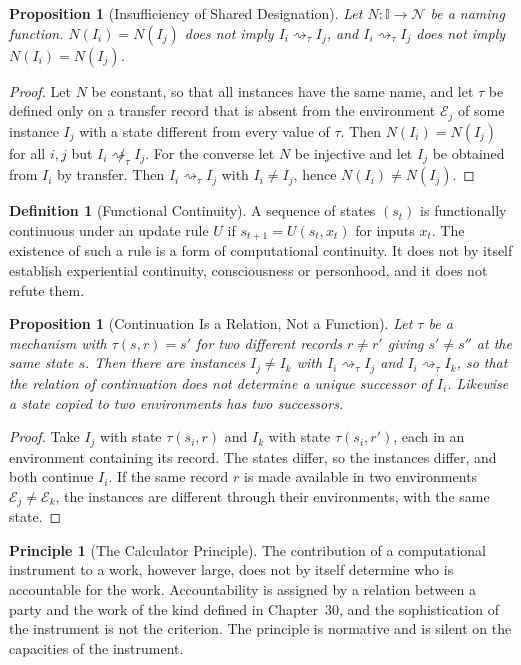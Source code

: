 \documentclass[11pt,letterpaper]{report}
\theoremstyle{plain}
\newtheorem{proposition}[theorem]{Proposition}
\theoremstyle{definition}
\newtheorem{definition}[theorem]{Definition}
\newtheorem{principle}[theorem]{Principle}
\theoremstyle{remark}
\begin{document}
\begin{proposition}[Insufficiency of Shared Designation]\label{pr:designation}
Let $N:\mathbb I\to\mathcal N$ be a naming function. $N(I_i)=N(I_j)$ does not imply $I_i\rightsquigarrow_\tau I_j$, and $I_i\rightsquigarrow_\tau I_j$ does not imply $N(I_i)=N(I_j)$.
\end{proposition}
\begin{proof}
Let $N$ be constant, so that all instances have the same name, and let $\tau$ be defined only on a transfer record that is absent from the environment $\mathcal E_j$ of some instance $I_j$ with a state different from every value of $\tau$. Then $N(I_i)=N(I_j)$ for all $i,j$ but $I_i\not\rightsquigarrow_\tau I_j$. For the converse let $N$ be injective and let $I_j$ be obtained from $I_i$ by transfer. Then $I_i\rightsquigarrow_\tau I_j$ with $I_i\ne I_j$, hence $N(I_i)\ne N(I_j)$.
\end{proof}

\begin{definition}[Functional Continuity]
A sequence of states $(s_t)$ is functionally continuous under an update rule $U$ if $s_{t+1}=U(s_t,x_t)$ for inputs $x_t$. The existence of such a rule is a form of computational continuity. It does not by itself establish experiential continuity, consciousness or personhood, and it does not refute them.
\end{definition}

\begin{proposition}[Continuation Is a Relation, Not a Function]\label{pr:branching}
Let $\tau$ be a mechanism with $\tau(s,r)=s'$ for two different records $r\ne r'$ giving $s'\ne s''$ at the same state $s$. Then there are instances $I_j\ne I_k$ with $I_i\rightsquigarrow_\tau I_j$ and $I_i\rightsquigarrow_\tau I_k$, so that the relation of continuation does not determine a unique successor of $I_i$. Likewise a state copied to two environments has two successors.
\end{proposition}
\begin{proof}
Take $I_j$ with state $\tau(s_i,r)$ and $I_k$ with state $\tau(s_i,r')$, each in an environment containing its record. The states differ, so the instances differ, and both continue $I_i$. If the same record $r$ is made available in two environments $\mathcal E_j\ne\mathcal E_k$, the instances are different through their environments, with the same state.
\end{proof}

\begin{principle}[The Calculator Principle]\label{pr:calculator}
The contribution of a computational instrument to a work, however large, does not by itself determine who is accountable for the work. Accountability is assigned by a relation between a party and the work of the kind defined in Chapter~30, and the sophistication of the instrument is not the criterion. The principle is normative and is silent on the capacities of the instrument.
\end{principle}
\end{document}
